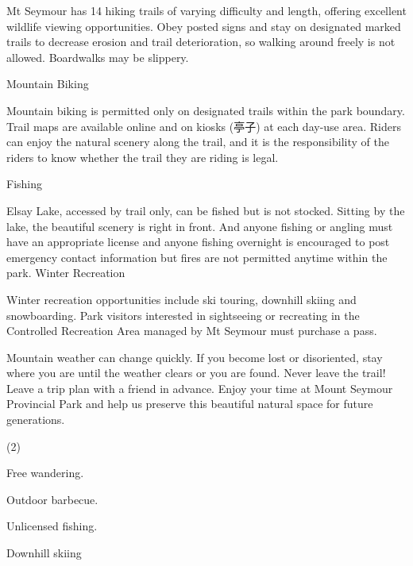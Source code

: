 \documentclass{英语试卷}
\begin{document}
\par Mt Seymour has 14 hiking trails of varying difficulty and length, offering excellent wildlife viewing opportunities. Obey posted signs and stay on designated marked trails to decrease erosion and trail deterioration, so walking around freely is not allowed. Boardwalks may be slippery.\par
\par Mountain Biking\par
\par Mountain biking is permitted only on designated trails within the park boundary. Trail maps are available online and on kiosks (亭子) at each day-use area. Riders can enjoy the natural scenery along the trail, and it is the responsibility of the riders to know whether the trail they are riding is legal.\par
\par Fishing\par
\par Elsay Lake, accessed by trail only, can be fished but is not stocked. Sitting by the lake, the beautiful scenery is right in front. And anyone fishing or angling must have an appropriate license and anyone fishing overnight is encouraged to post emergency contact information but fires are not permitted anytime within the park. Winter Recreation\par
\par Winter recreation opportunities include ski touring, downhill skiing and snowboarding. Park visitors interested in sightseeing or recreating in the Controlled Recreation Area managed by Mt Seymour must purchase a pass.\par
\par Mountain weather can change quickly. If you become lost or disoriented, stay where you are until the weather clears or you are found. Never leave the trail! Leave a trip plan with a friend in advance. Enjoy your time at Mount Seymour Provincial Park and help us preserve this beautiful natural space for future generations.\par
{}
\begin{choices}(2)
  \item Free wandering.
  \item Outdoor barbecue.
  \item Unlicensed fishing.
  \item Downhill skiing
\end{choices}
\end{document}

